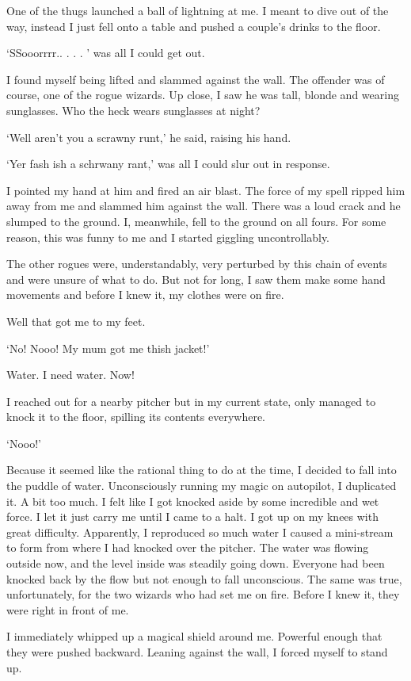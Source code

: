 One of the thugs launched a ball of lightning at me. I meant to dive out of the way, instead I just fell onto a table and pushed a couple's drinks to the floor.

`SSooorrrr.. . . . ' was all I could get out.

I found myself being lifted and slammed against the wall. The offender was of course, one of the rogue wizards. Up close, I saw he was tall, blonde and wearing sunglasses. Who the heck wears sunglasses at night?

`Well aren't you a scrawny runt,' he said, raising his hand.

`Yer fash ish a schrwany rant,' was all I could slur out in response.

I pointed my hand at him and fired an air blast. The force of my spell ripped him away from me and slammed him against the wall. There was a loud crack and he slumped to the ground. I, meanwhile, fell to the ground on all fours. For some reason, this was funny to me and I started giggling uncontrollably.

The other rogues were, understandably, very perturbed by this chain of events and were unsure of what to do. But not for long, I saw them make some hand movements and before I knew it, my clothes were on fire.

Well that got me to my feet.

`No! Nooo! My mum got me thish jacket!'

Water. I need water. Now!

I reached out for a nearby pitcher but in my current state, only managed to knock it to the floor, spilling its contents everywhere.

`Nooo!'

Because it seemed like the rational thing to do at the time, I decided to fall into the puddle of water. Unconsciously running my magic on autopilot, I duplicated it. A bit too much. I felt like I got knocked aside by some incredible and wet force. I let it just carry me until I came to a halt. I got up on my knees with great difficulty. Apparently, I reproduced so much water I caused a mini-stream to form from where I had knocked over the pitcher. The water was flowing outside now, and the level inside was steadily going down. Everyone had been knocked back by the flow but not enough to fall unconscious. The same was true, unfortunately, for the two wizards who had set me on fire. Before I knew it, they were right in front of me.

I immediately whipped up a magical shield around me. Powerful enough that they were pushed backward. Leaning against the wall, I forced myself to stand up.

